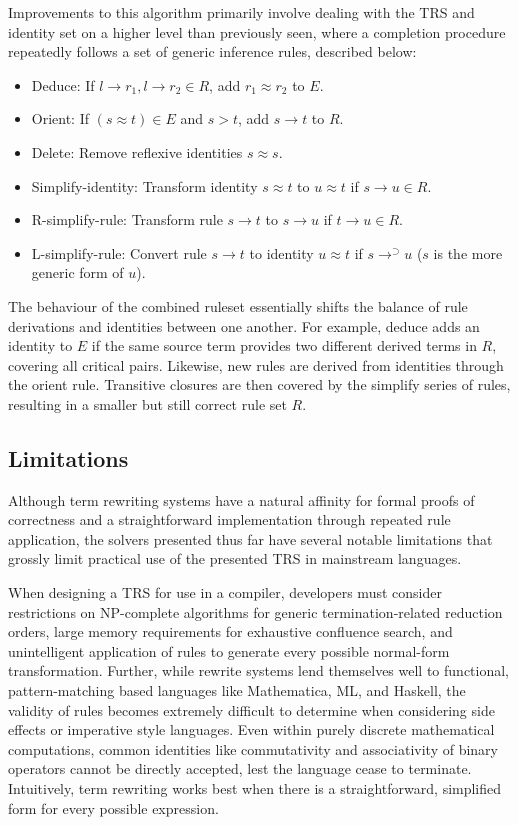 \documentclass{article}
\begin{document}
Improvements to this algorithm primarily involve dealing with the TRS and identity set on a higher level than previously seen, where a completion procedure
repeatedly follows a set of generic inference rules, described below:
\begin{itemize}
    \item Deduce: If $l \rightarrow r_1, l \rightarrow r_2 \in R$, add $r_1 \approx r_2$ to $E$.
    \item Orient: If $(s \approx t) \in E$ and $s > t$, add $s \rightarrow t$ to $R$.
    \item Delete: Remove reflexive identities $s \approx s$.
    \item Simplify-identity: Transform identity $s \approx t$ to $u \approx t$ if $s \rightarrow u \in R$.
    \item R-simplify-rule: Transform rule $s \rightarrow t$ to $s \rightarrow u$ if $t \rightarrow u \in R$.
    \item L-simplify-rule: Convert rule $s \rightarrow t$ to identity $u \approx t$ if $s \rightarrow^{\supset} u$ ($s$ is the more generic form of $u$).
\end{itemize}
The behaviour of the combined ruleset essentially shifts the balance of rule derivations and identities between one another. For example, deduce adds an identity
to $E$ if the same source term provides two different derived terms in $R$, covering all critical pairs.
Likewise, new rules are derived from identities through the orient rule.
Transitive closures are then covered by the simplify series of rules, resulting in a smaller but still correct rule set $R$.

\subsection{Limitations}
Although term rewriting systems have a natural affinity for formal proofs of correctness
and a straightforward implementation through repeated rule application,
the solvers presented thus far have several notable limitations that grossly limit practical use of the presented TRS in mainstream languages.

When designing a TRS for use in a compiler, developers must consider restrictions on
NP-complete algorithms for generic termination-related reduction orders, large memory requirements for exhaustive confluence search,
and unintelligent application of rules to generate every possible normal-form transformation.
Further, while rewrite systems lend themselves well to functional, pattern-matching based languages like Mathematica, ML, and Haskell,
the validity of rules becomes extremely difficult to determine when considering side effects or imperative style languages.
Even within purely discrete mathematical computations, common identities like commutativity and associativity of binary operators
cannot be directly accepted, lest the language cease to terminate. Intuitively, term rewriting works best when there is a straightforward,
simplified form for every possible expression.
\end{document}
